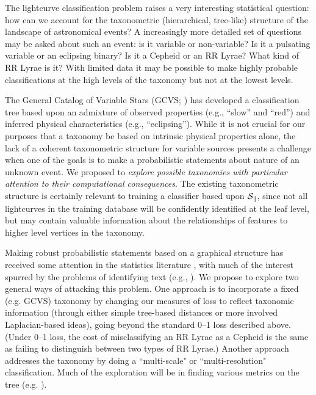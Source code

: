 The lightcurve classification problem raises a very interesting statistical
question: how can we account for the taxonometric (hierarchical, tree-like)
structure of the landscape of astronomical events? A increasingly more detailed
set of questions may be asked about such an event: is it variable or
non-variable? Is it a pulsating variable or an eclipsing binary?  Is it a
Cepheid or an RR Lyrae? What kind of RR Lyrae is it?  With limited data it may
be possible to make highly probable classifications at the high levels of the
taxonomy but not at the lowest levels.

The General Catalog of Variable Stars (GCVS; \citealt{ksf+96}) has developed a
classification tree based upon an admixture of observed properties (e.g.,
``slow'' and ``red'') and inferred physical characteristics (e.g.,
``eclipsing'').  While it is not crucial for our purposes that a taxonomy be
based on intrinsic physical properties alone, the lack of a coherent
taxonometric structure for variable sources presents a challenge when one of the
goals is to make a  probabilistic statements about nature of an unknown event.
We proposed to {\it explore possible taxonomies with particular attention to
their computational consequences}.  The existing taxonometric structure is
certainly relevant to training a classifier based upon $\cal S_k$, since not all
lightcurves in the training database will be confidently identified at the leaf
level, but may contain valuable information about the relationships of features
to higher level vertices in the taxonomy.

Making robust probabilistic statements based on a graphical structure has
received some attention in the statistics literature
\citep{DBLP:conf/icml/KollerS97,DBLP:conf/icdm/SunL01,DBLP:conf/icml/DekelKS04,
CesaBianchi06,  bcmt-lmmsc-04}, with much of the interest spurred by the
problems of identifying text (e.g., \citealt{593971}). We propose to explore two
general ways of attacking this problem. One approach is to incorporate a fixed
(e.g. GCVS) taxonomy by changing our measures of loss to reflect taxonomic
information (through either simple tree-based distances or more involved
Laplacian-based ideas), going beyond the standard 0--1 loss described above.
(Under 0--1 loss, the cost of misclassifying an RR Lyrae as a Cepheid is the
same as failing to distinguish between two types of RR Lyrae.) Another approach
addresses the taxonomy by doing a ``multi-scale" or ``multi-resolution"
classification. Much of the exploration will be in finding various metrics on
the tree (e.g. \cite{ChungSpectralGraphTheoryBook97}).

